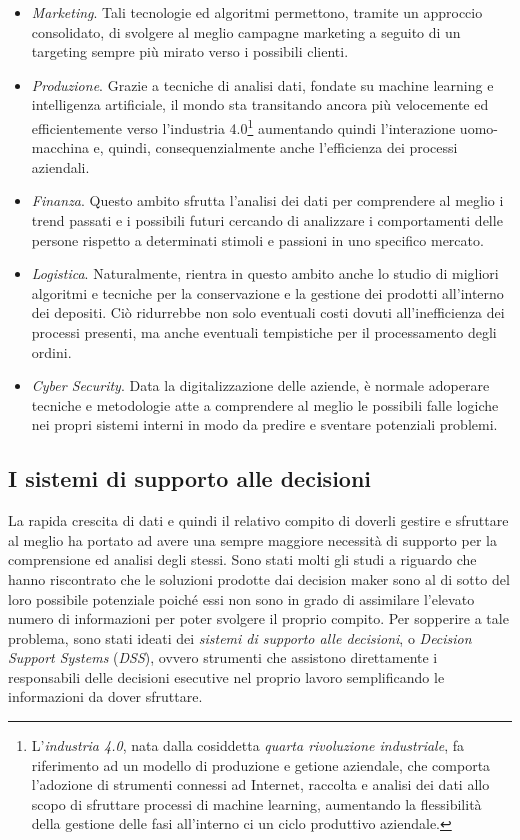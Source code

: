 \begin{itemize}
    \item \textit{Marketing}. Tali tecnologie ed algoritmi permettono, tramite un approccio consolidato, di svolgere al meglio campagne marketing a seguito di un targeting sempre più mirato verso i possibili clienti.
    \item \textit{Produzione}. Grazie a tecniche di analisi dati, fondate su machine learning e intelligenza artificiale, il mondo sta transitando ancora più velocemente ed efficientemente verso l'industria 4.0\footnote{L'\textit{industria 4.0}, nata dalla cosiddetta \textit{quarta rivoluzione industriale}, fa riferimento ad un modello di produzione e getione aziendale, che comporta l'adozione di strumenti connessi ad Internet, raccolta e analisi dei dati allo scopo di sfruttare processi di machine learning, aumentando la flessibilità della gestione delle fasi all'interno ci un ciclo produttivo aziendale.\cite{unifi_industry_4}} aumentando quindi l'interazione uomo-macchina e, quindi, consequenzialmente anche l'efficienza dei processi aziendali.
    \item \textit{Finanza}. Questo ambito sfrutta l'analisi dei dati per comprendere al meglio i trend passati e i possibili futuri cercando di analizzare i comportamenti delle persone rispetto a determinati stimoli e passioni in uno specifico mercato.
    \item \textit{Logistica}. Naturalmente, rientra in questo ambito anche lo studio di migliori algoritmi e tecniche per la conservazione e la gestione dei prodotti all'interno dei depositi. Ciò ridurrebbe non solo eventuali costi dovuti all'inefficienza dei processi presenti, ma anche eventuali tempistiche per il processamento degli ordini.
    \item \textit{Cyber Security}. Data la digitalizzazione delle aziende, è normale adoperare tecniche e metodologie atte a comprendere al meglio le possibili falle logiche nei propri sistemi interni in modo da predire e sventare potenziali problemi.
\end{itemize}

\subsection{I sistemi di supporto alle decisioni}

La rapida crescita di dati e quindi il relativo compito di doverli gestire e sfruttare al meglio ha portato ad avere una sempre maggiore necessità di supporto per la comprensione ed analisi degli stessi. Sono stati molti gli studi a riguardo che hanno riscontrato che le soluzioni prodotte dai decision maker sono al di sotto del loro possibile potenziale poiché essi non sono in grado di assimilare l'elevato numero di informazioni per poter svolgere il proprio compito. Per sopperire a tale problema, sono stati ideati dei \textit{sistemi di supporto alle decisioni}, o \textit{Decision Support Systems} (\textit{DSS}), ovvero strumenti che assistono direttamente i responsabili delle decisioni esecutive nel proprio lavoro semplificando le informazioni da dover sfruttare.\cite{dss_introduction}

